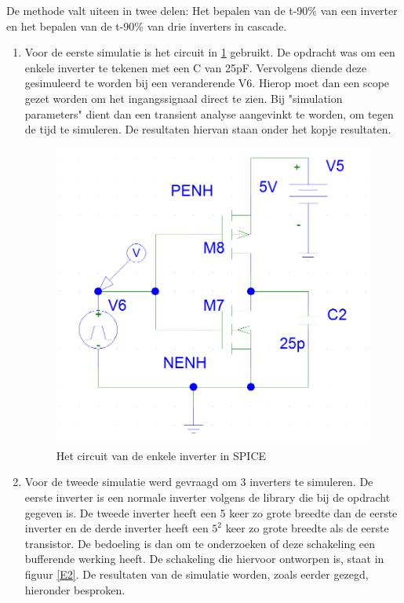 

De methode valt uiteen in twee delen: Het bepalen van de t-90\% van een inverter en het bepalen van de t-90\% van drie inverters in cascade. 
\begin{enumerate}
\item Voor de eerste simulatie is het circuit in \ref{E1} gebruikt. De opdracht was om een enkele inverter te tekenen met een C van 25pF. Vervolgens diende deze gesimuleerd te worden bij een veranderende V6. Hierop moet dan een scope gezet worden om het ingangssignaal direct te zien. Bij "simulation parameters" dient dan een transient analyse aangevinkt te worden, om tegen de tijd te simuleren. De resultaten hiervan staan onder het kopje resultaten. 

\begin{figure} [h!]
\centering
\includegraphics [scale = 0.4] {inputfiles/Inverter_circuit}
\caption{Het circuit van de enkele inverter in SPICE}
\label{E1}
\end{figure}
\newpage
\item Voor de tweede simulatie werd gevraagd om 3 inverters te simuleren. De eerste inverter is een normale inverter volgens de library die bij de opdracht gegeven is. De tweede inverter heeft een 5 keer zo grote breedte dan de eerste inverter en de derde inverter heeft een $5^2$ keer zo grote breedte als de eerste transistor. De bedoeling is dan om te onderzoeken of deze schakeling een bufferende werking heeft. De schakeling die hiervoor ontworpen is, staat in figuur \ref{E2}. De resultaten van de simulatie worden,  zoals eerder gezegd, hieronder besproken. 

\end{enumerate}
